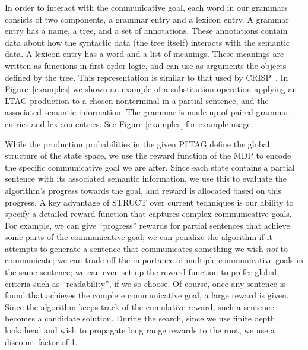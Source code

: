  In order to interact with the communicative goal, each word in our
 grammars consists of two components, a grammar entry and a lexicon
 entry.  A grammar entry has a name, a tree, and a set of annotations.
 These annotations contain data about how the syntactic data (the tree
 itself) interacts with the semantic data.  A lexicon entry has a word
 and a list of meanings.  These meanings are written as functions in
 first order logic, and can use as arguments the objects defined by
 the tree. This representation is similar to that used by
 CRISP~\cite{koller_sentence_2007}. In Figure~\ref{examples} we shown
 an example of a substitution operation applying an LTAG production to
 a chosen nonterminal in a partial sentence, and the associated
 semantic information.
 The grammar is made up of paired grammar entries and lexicon entries.
 See Figure \ref{examples} for example usage.

 While the production probabilities in the given PLTAG define the
 global structure of the state space, we use the reward function of
 the MDP to encode the specific communicative goal we are after. Since
 each state contains a partial sentence with its associated semantic
 information, we use this to evaluate the algorithm's progress towards
 the goal, and reward is allocated based on this progress. A key
 advantage of STRUCT over current techniques is our ability to specify
 a detailed reward function that captures complex communicative goals.
 For example, we can give ``progress'' rewards for partial sentences
 that achieve some parts of the communicative goal; we can penalize
 the algorithm if it attempts to generate a sentence that communicates
 something we wish {\em not} to communicate; we can trade off the
 importance of multiple communicative goals in the same sentence; we
 can even set up the reward function to prefer global criteria such as
 ``readability'', if we so choose. Of course, once any sentence is
 found that achieves the complete communicative goal, a large reward
 is given. Since the algorithm keeps track of the cumulative reward,
 such a sentence becomes a candidate solution. During the search,
 since we use finite depth lookahead and wish to propagate long range
 rewards to the root, we use a discount factor of 1.


